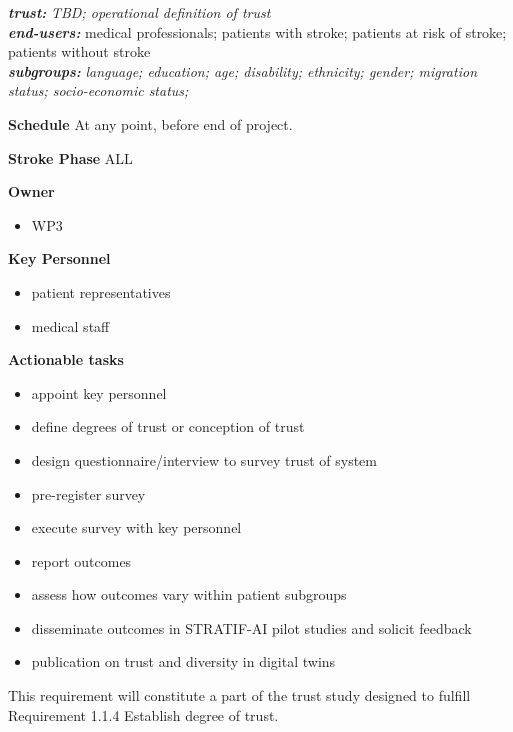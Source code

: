 \documentclass[
  letterpaper,
  DIV=11,
  numbers=noendperiod]{scrreport}
\providecommand{\tightlist}{%
  \setlength{\itemsep}{0pt}\setlength{\parskip}{0pt}}\usepackage{longtable,booktabs,array}
\begin{document}
\textbf{\emph{trust:}} \emph{TBD; operational definition of trust}\\
\textbf{\emph{end-users:}} medical professionals; patients with stroke;
patients at risk of stroke; patients without stroke\\
\textbf{\emph{subgroups:}} \emph{language; education; age; disability;
ethnicity; gender; migration status; socio-economic status;}

\textbf{Schedule} At any point, before end of project.

\textbf{Stroke Phase} ALL

\textbf{Owner}

\begin{itemize}
\tightlist
\item
  WP3
\end{itemize}

\textbf{Key Personnel}

\begin{itemize}
\tightlist
\item
  patient representatives
\item
  medical staff
\end{itemize}

\textbf{Actionable tasks}

\begin{itemize}
\tightlist
\item
  appoint key personnel
\item
  define degrees of trust or conception of trust
\item
  design questionnaire/interview to survey trust of system
\item
  pre-register survey
\item
  execute survey with key personnel
\item
  report outcomes
\item
  assess how outcomes vary within patient subgroups
\item
  disseminate outcomes in STRATIF-AI pilot studies and solicit feedback
\item
  publication on trust and diversity in digital twins
\end{itemize}

\begin{tcolorbox}[enhanced jigsaw, arc=.35mm, breakable, coltitle=black, toptitle=1mm, colbacktitle=quarto-callout-note-color!10!white, toprule=.15mm, left=2mm, bottomrule=.15mm, opacitybacktitle=0.6, titlerule=0mm, colback=white, opacityback=0, title=\textcolor{quarto-callout-note-color}{\faInfo}\hspace{0.5em}{Note}, bottomtitle=1mm, colframe=quarto-callout-note-color-frame, leftrule=.75mm, rightrule=.15mm]

This requirement will constitute a part of the trust study designed to
fulfill Requirement 1.1.4 Establish degree of trust.

\end{tcolorbox}
\end{document}
